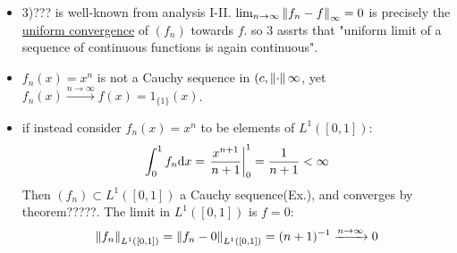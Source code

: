 \documentclass{article}
\begin{document}
\begin{remark}
\begin{itemize}
    \item 3)??? is well-known from analysis I-II. $\lim_{n\to\infty}\left\|{f_n-f}\right\|_\infty=0$ is precisely the \underline{uniform convergence} of $(f_n)$ towards $f$. so 3 assrts that "uniform limit of a sequence of continuous functions is again continuous".
    \item $f_n(x)=x^n$ is not a Cauchy sequence in $(c,\left\|{\cdot}\right\|\infty$, yet $f_n(x)\xrightarrow{n\to\infty} f(x)=1_{\{1\}}(x)$.
    \item if instead consider $f_n(x)=x^n$ to be elements of $L^1([0,1])$:
    $$\int_0^1f_n{\rm d}x=\left.\frac{x^{n+1}}{n+1}\right|^1_0=\frac{1}{n+1}<\infty$$
    Then $(f_n)\subset L^1([0,1])$ a Cauchy sequence(Ex.), and converges by theorem?????. The limit in $L^1([0,1])$ is $f=0$:
    $$\left\|{f_n}\right\|_{L^1([0,1])}=\left\|{f_n-0}\right\|_{L^1([0,1])}=(n+1)^{-1}\xrightarrow{n\to\infty}0$$
\end{itemize}
    
\end{remark}
\end{document}
